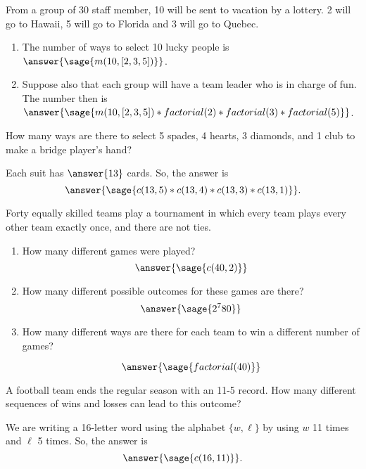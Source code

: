 \documentclass{ximera}
\begin{document}
\begin{problem}
From a group of 30 staff member, 10 will be sent to vacation by a lottery. 2 will go to Hawaii, 5 will go to Florida and 3 will go to Quebec.

\begin{enumerate}
    \item The number of ways to select 10 lucky people is $\answer{\sage{m(10,[2,3,5])}}$.
    \item Suppose also that each group will have a team leader who is in charge of fun. The number then is $\answer{\sage{m(10,[2,3,5])*factorial(2)*factorial(3)*factorial(5)}}$.    
\end{enumerate}
\end{problem}
\begin{problem}
How many ways are there to select 5 spades, 4 hearts, 3 diamonds, and 1 club to make a bridge player's hand?

\begin{explanation}
   Each suit has $\answer{13}$ cards. So, the answer is 
   $$\answer{\sage{c(13,5)*c(13,4)*c(13,3)*c(13,1)}}.$$
\end{explanation}
\end{problem}


\begin{problem}
Forty equally skilled teams play a tournament in which every team plays every other team exactly once, and there are not ties.

\begin{enumerate}
\item  How many different games were played?
$$
\answer{\sage{c(40,2)}}
$$
\item  How many different possible outcomes for these games are
there?
$$
\answer{\sage{2^780}}
$$
\item  How many different ways are there for each team to win a different number of games?

$$
\answer{\sage{factorial(40)}}
$$ 
\end{enumerate}
\end{problem}

\begin{problem} 
A football team ends the regular season with an 11-5 record. How many different sequences of wins and losses can lead to this outcome?

\begin{explanation}
   We are writing a 16-letter word using the alphabet $\{w,\ell\}$ by using $w$ 11 times and $\ell$ 5 times. So, the answer is 
   $$\answer{\sage{c(16,11)}}.$$
\end{explanation}
\end{problem}
\end{document}
